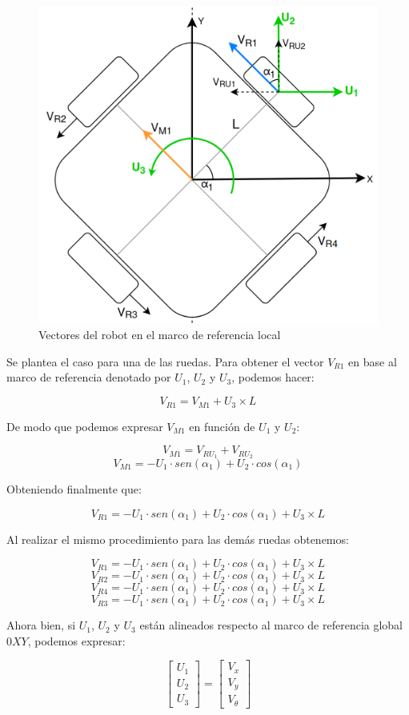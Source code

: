 \begin{figure}[H]
    \centering
    \includegraphics[width=0.6\linewidth]{images/modelo_cinematico_robot_vector.png}
    \caption{Vectores del robot en el marco de referencia local}
    \label{fig:robotmarcoreflocal}
\end{figure}

Se plantea el caso para una de las ruedas. Para obtener el vector $V_{R1}$ en base al marco de referencia denotado por $U_1$, $U_2$ y $U_3$, podemos hacer:

$$ V_{R1} = V_{M1} + U_3 \times L $$

De modo que podemos expresar $V_{M1}$ en función de $U_1$ y $U_2$:

$$ V_{M1} = V_{RU_1} + V_{RU_2} $$
$$ V_{M1} = -U_1 \cdot sen(\alpha_1) + U_2 \cdot cos(\alpha_1) $$

Obteniendo finalmente que:

$$ V_{R1} = -U_1 \cdot sen(\alpha_1) + U_2 \cdot cos(\alpha_1) + U_3 \times L $$

Al realizar el mismo procedimiento para las demás ruedas obtenemos:

$$ V_{R1} = -U_1 \cdot sen(\alpha_1) + U_2 \cdot cos(\alpha_1) + U_3 \times L $$
$$ V_{R2} = -U_1 \cdot sen(\alpha_1) + U_2 \cdot cos(\alpha_1) + U_3 \times L $$
$$ V_{R4} = -U_1 \cdot sen(\alpha_1) + U_2 \cdot cos(\alpha_1) + U_3 \times L $$
$$ V_{R3} = -U_1 \cdot sen(\alpha_1) + U_2 \cdot cos(\alpha_1) + U_3 \times L $$

Ahora bien, si $U_1$, $U_2$ y $U_3$ están alineados respecto al marco de referencia global $0XY$, podemos expresar:

$$ \begin{bmatrix} U_1 \\ U_2 \\ U_3 \end{bmatrix} = \begin{bmatrix} V_x \\ V_y \\ V_\theta \end{bmatrix} $$

